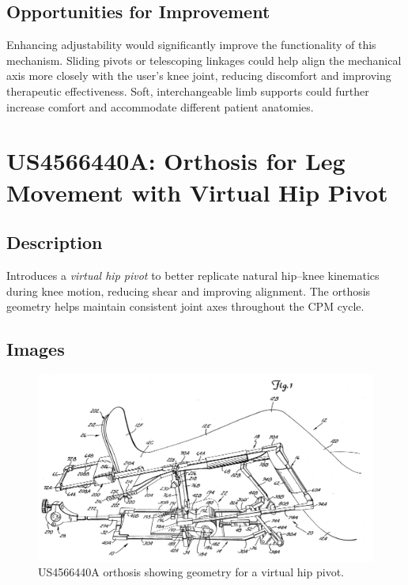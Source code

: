 \documentclass[11pt]{article}
\begin{document}
\subsection{Opportunities for Improvement}
Enhancing adjustability would significantly improve the functionality of this mechanism. Sliding pivots or telescoping linkages could help align the mechanical axis more closely with the user's knee joint, reducing discomfort and improving therapeutic effectiveness. Soft, interchangeable limb supports could further increase comfort and accommodate different patient anatomies.

\section{US4566440A: Orthosis for Leg Movement with Virtual Hip Pivot}
\subsection{Description}
Introduces a \emph{virtual hip pivot} to better replicate natural hip–knee kinematics during knee motion, reducing shear and improving alignment. The orthosis geometry helps maintain consistent joint axes throughout the CPM cycle.
\subsection{Images}
\begin{figure}[H]
  \centering
  \includegraphics[width=0.54\linewidth]{US4566440_1.png}
  \caption{US4566440A orthosis showing geometry for a virtual hip pivot.}
  \label{fig:US4566440A}
\end{figure}
\end{document}
